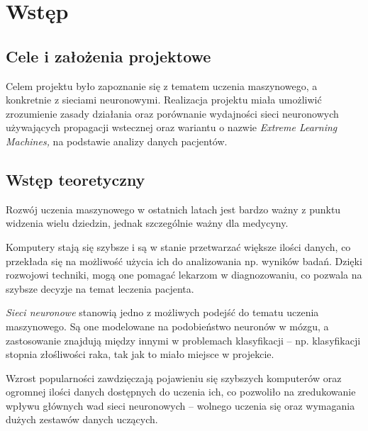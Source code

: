 \chapter{Wstęp}
\section{Cele i założenia projektowe}
Celem projektu było zapoznanie się z tematem uczenia maszynowego, a konkretnie z sieciami neuronowymi.
Realizacja projektu miała umożliwić zrozumienie zasady działania oraz porównanie wydajności sieci neuronowych używających propagacji wstecznej oraz wariantu o nazwie \textit{Extreme Learning Machines,} na podstawie analizy danych pacjentów.
\section{Wstęp teoretyczny}
Rozwój uczenia maszynowego w ostatnich latach jest bardzo ważny z punktu widzenia wielu dziedzin, jednak szczególnie ważny dla medycyny.

Komputery stają się szybsze i są w stanie przetwarzać większe ilości danych, co przekłada się na możliwość użycia ich do analizowania np. wyników badań.
Dzięki rozwojowi techniki, mogą one pomagać lekarzom w diagnozowaniu, co pozwala na szybsze decyzje na temat leczenia pacjenta.

\textit{Sieci neuronowe} stanowią jedno z możliwych podejść do tematu uczenia maszynowego.
Są one modelowane na podobieństwo neuronów w mózgu, a zastosowanie znajdują między innymi w problemach klasyfikacji -- np. klasyfikacji stopnia złośliwości raka, tak jak to miało miejsce w projekcie.

Wzrost popularności zawdzięczają pojawieniu się szybszych komputerów oraz ogromnej ilości danych dostępnych do uczenia ich, co pozwoliło na zredukowanie wpływu głównych wad sieci neuronowych -- wolnego uczenia się oraz wymagania dużych zestawów danych uczących.
